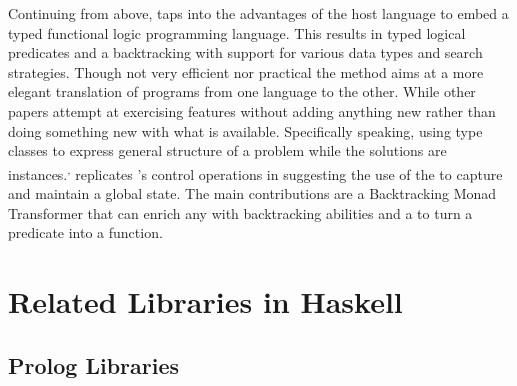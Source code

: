 \documentclass[thesis-solanki.tex]{subfiles}
\begin{document}
Continuing from above, \cite{claessen2000typed} taps into the advantages of the host language to embed a typed
functional logic programming language.
This results in typed logical predicates and a backtracking  with support for various data types and search
strategies.
Though not very efficient nor practical the method aims at a more elegant translation of programs from one language
to the other.
While other papers \cite{erwig2004escape} attempt at exercising  features without adding
anything new rather than doing something new with what is available.
Specifically speaking, using  type classes to express general structure of a problem while the
solutions are instances.\textsuperscript{,}
\cite{hinze1998prological} replicates 's control operations in  suggesting the
use of the   to capture and maintain a global state.
The main contributions are a Backtracking Monad Transformer that can enrich any  with backtracking abilities
and a  to turn a  predicate into a  function.



\section{Related Libraries in Haskell}
\subsection{Prolog Libraries}
\end{document}
